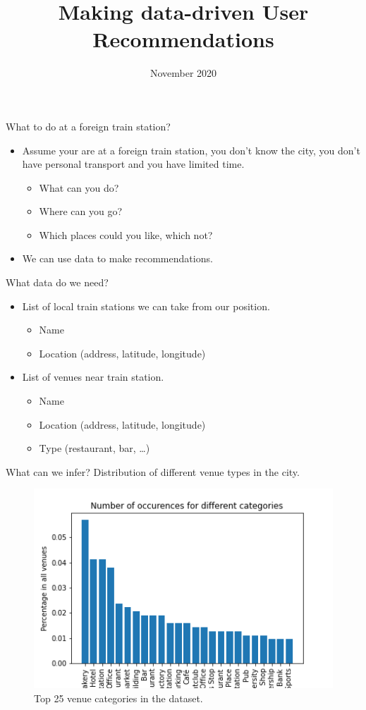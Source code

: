 \documentclass{beamer}
\title{Making data-driven User Recommendations}
\institute{Coursera Capstone}
\date{November 2020}
\begin{document}
\frame{\titlepage}

\begin{frame}{What to do at a foreign train station?}
\begin{itemize}
\item Assume your are at a foreign train station, you don't know the city, you don't have personal transport and you have limited time.
\begin{itemize}
\item What can you do?
\item Where can you go?
\item Which places could you like, which not?
\end{itemize}
\item We can use data to make recommendations.
\end{itemize}
\end{frame}

\begin{frame}{What data do we need?}
\begin{itemize}
\item List of local train stations we can take from our position.
\begin{itemize}
\item Name
\item Location (address, latitude, longitude)
\end{itemize}
\item List of venues near train station.
\begin{itemize}
\item Name
\item Location (address, latitude, longitude)
\item Type (restaurant, bar, \ldots)
\end{itemize}
\end{itemize}
\end{frame}

\begin{frame}{What can we infer?}
Distribution of different venue types in the city.
\begin{figure}
\centering
\includegraphics[scale=0.5]{images/dist_overall.png}
\caption{Top 25 venue categories in the dataset.}
\end{figure}
\end{frame}
\end{document}
